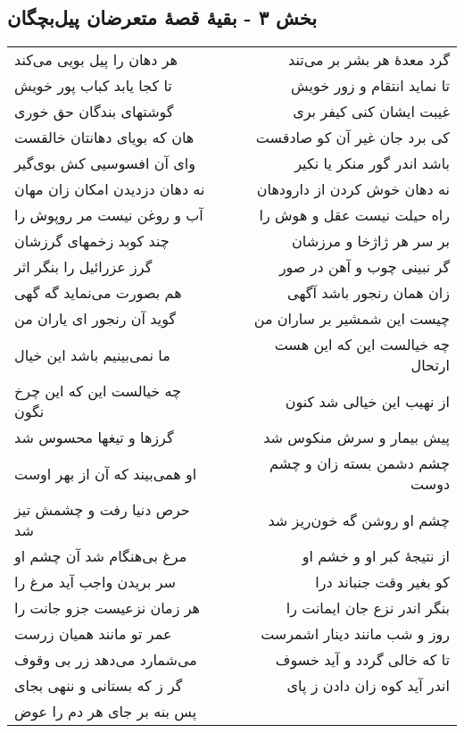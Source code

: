\begin{center}
\section*{بخش ۳ - بقیهٔ قصهٔ متعرضان پیل‌بچگان}
\label{sec:sh003}
\begin{longtable}{l p{0.5cm} r}
هر دهان را پیل بویی می‌کند
&&
گرد معدهٔ هر بشر بر می‌تند
\\
تا کجا یابد کباب پور خویش
&&
تا نماید انتقام و زور خویش
\\
گوشتهای بندگان حق خوری
&&
غیبت ایشان کنی کیفر بری
\\
هان که بویای دهانتان خالقست
&&
کی برد جان غیر آن کو صادقست
\\
وای آن افسوسیی کش بوی‌گیر
&&
باشد اندر گور منکر یا نکیر
\\
نه دهان دزدیدن امکان زان مهان
&&
نه دهان خوش کردن از دارودهان
\\
آب و روغن نیست مر روپوش را
&&
راه حیلت نیست عقل و هوش را
\\
چند کوبد زخمهای گرزشان
&&
بر سر هر ژاژخا و مرزشان
\\
گرز عزرائیل را بنگر اثر
&&
گر نبینی چوب و آهن در صور
\\
هم بصورت می‌نماید گه گهی
&&
زان همان رنجور باشد آگهی
\\
گوید آن رنجور ای یاران من
&&
چیست این شمشیر بر ساران من
\\
ما نمی‌بینیم باشد این خیال
&&
چه خیالست این که این هست ارتحال
\\
چه خیالست این که این چرخ نگون
&&
از نهیب این خیالی شد کنون
\\
گرزها و تیغها محسوس شد
&&
پیش بیمار و سرش منکوس شد
\\
او همی‌بیند که آن از بهر اوست
&&
چشم دشمن بسته زان و چشم دوست
\\
حرص دنیا رفت و چشمش تیز شد
&&
چشم او روشن گه خون‌ریز شد
\\
مرغ بی‌هنگام شد آن چشم او
&&
از نتیجهٔ کبر او و خشم او
\\
سر بریدن واجب آید مرغ را
&&
کو بغیر وقت جنباند درا
\\
هر زمان نزعیست جزو جانت را
&&
بنگر اندر نزع جان ایمانت را
\\
عمر تو مانند همیان زرست
&&
روز و شب مانند دینار اشمرست
\\
می‌شمارد می‌دهد زر بی وقوف
&&
تا که خالی گردد و آید خسوف
\\
گر ز که بستانی و ننهی بجای
&&
اندر آید کوه زان دادن ز پای
\\
پس بنه بر جای هر دم را عوض

\end{longtable}
\end{center}
